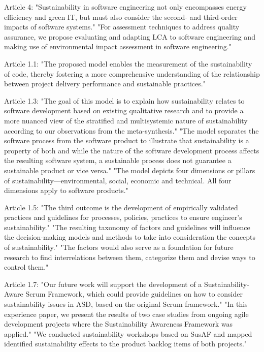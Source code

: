 \begin{itemize}
Article 4:
"Sustainability in software engineering not only encompasses energy efficiency and green IT, but must also consider the second- and third-order impacts of software systems." 
"For assessment techniques to address quality assurance, we propose evaluating and adapting LCA to software engineering and making use of environmental impact assessment in software engineering."

Article 1.1:
"The proposed model enables the measurement of the sustainability of code, thereby fostering a more comprehensive understanding of the relationship between project delivery performance and sustainable practices."

Article 1.3:
"The goal of this model is to explain how sustainability relates to software development based on existing qualitative research and to provide a more nuanced view of the stratified and multisystemic nature of sustainability according to our observations from the meta-synthesis." 
"The model separates the software process from the software product to illustrate that sustainability is a property of both and while the nature of the software development process affects the resulting software system, a sustainable process does not guarantee a sustainable product or vice versa." 
"The model depicts four dimensions or pillars of sustainability—environmental, social, economic and technical. All four dimensions apply to software products."

Article 1.5:
"The third outcome is the development of empirically validated practices and guidelines for processes, policies, practices to ensure engineer’s sustainability." 
"The resulting taxonomy of factors and guidelines will influence the decision-making models and methods to take into consideration the concepts of sustainability." 
"The factors would also serve as a foundation for future research to find interrelations between them, categorize them and devise ways to control them."

Article 1.7:
"Our future work will support the development of a Sustainability-Aware Scrum Framework, which could provide guidelines on how to consider sustainability issues in ASD, based on the original Scrum framework." 
"In this experience paper, we present the results of two case studies from ongoing agile development projects where the Sustainability Awareness Framework was applied." 
"We conducted sustainability workshops based on SusAF and mapped identified sustainability effects to the product backlog items of both projects."


\end{itemize}
